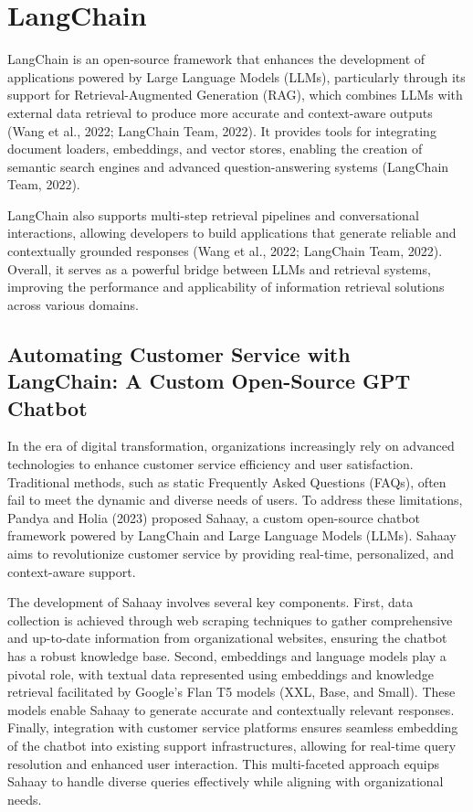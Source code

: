 \section{LangChain}

LangChain is an open-source framework that enhances the development of applications powered by Large Language Models (LLMs), particularly through its support for Retrieval-Augmented Generation (RAG), which combines LLMs with external data retrieval to produce more accurate and context-aware outputs (Wang et al., 2022; LangChain Team, 2022). It provides tools for integrating document loaders, embeddings, and vector stores, enabling the creation of semantic search engines and advanced question-answering systems (LangChain Team, 2022).

LangChain also supports multi-step retrieval pipelines and conversational interactions, allowing developers to build applications that generate reliable and contextually grounded responses (Wang et al., 2022; LangChain Team, 2022). Overall, it serves as a powerful bridge between LLMs and retrieval systems, improving the performance and applicability of information retrieval solutions across various domains.

\subsection{Automating Customer Service with LangChain: A Custom Open-Source GPT Chatbot}

In the era of digital transformation, organizations increasingly rely on advanced technologies to enhance customer service efficiency and user satisfaction. Traditional methods, such as static Frequently Asked Questions (FAQs), often fail to meet the dynamic and diverse needs of users. To address these limitations, Pandya and Holia (2023) proposed Sahaay, a custom open-source chatbot framework powered by LangChain and Large Language Models (LLMs). Sahaay aims to revolutionize customer service by providing real-time, personalized, and context-aware support.

The development of Sahaay involves several key components. First, data collection is achieved through web scraping techniques to gather comprehensive and up-to-date information from organizational websites, ensuring the chatbot has a robust knowledge base. Second, embeddings and language models play a pivotal role, with textual data represented using embeddings and knowledge retrieval facilitated by Google's Flan T5 models (XXL, Base, and Small). These models enable Sahaay to generate accurate and contextually relevant responses. Finally, integration with customer service platforms ensures seamless embedding of the chatbot into existing support infrastructures, allowing for real-time query resolution and enhanced user interaction. This multi-faceted approach equips Sahaay to handle diverse queries effectively while aligning with organizational needs.

